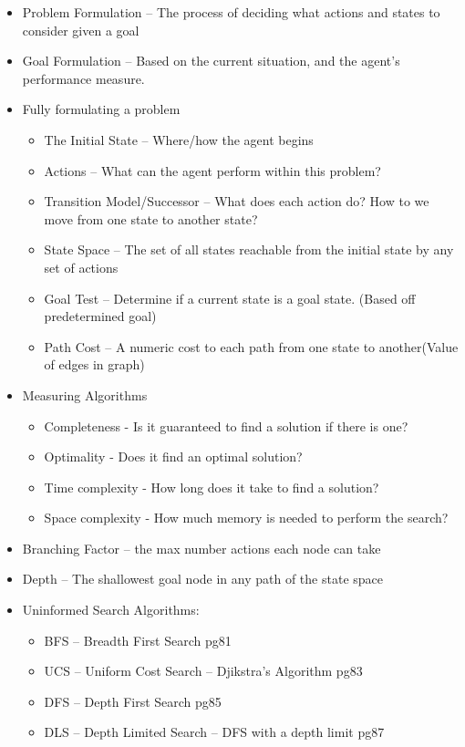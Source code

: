 \documentclass{article}
\begin{document}
\begin{itemize}
	\item Problem Formulation -- The process of deciding what actions and states to consider given a goal
	\item Goal Formulation -- Based on the current situation, and the agent's performance measure.
	\item Fully formulating a problem
	\begin{itemize}
		\item The Initial State -- Where/how the agent begins
		\item Actions -- What can the agent perform within this problem?
		\item Transition Model/Successor -- What does each action do? How to we move from one state to another state?
		\item State Space -- The set of all states reachable from the initial state by any set of actions
		\item Goal Test -- Determine if a current state is a goal state. (Based off predetermined goal)
		\item Path Cost -- A numeric cost to each path from one state to another(Value of edges in graph)
	\end{itemize}
	\item Measuring Algorithms
	\begin{itemize}
		\item Completeness - Is it guaranteed to find a solution if there is one?
		\item Optimality - Does it find an optimal solution?
		\item Time complexity - How long does it take to find a solution?
		\item Space complexity - How much memory is needed to perform the search?
	\end{itemize}
	\item Branching Factor -- the max number actions each node can take
	\item Depth -- The shallowest goal node in any path of the state space
	\item Uninformed Search Algorithms:
	\begin{itemize}
		\item BFS -- Breadth First Search pg81
		\item UCS -- Uniform Cost Search -- Djikstra's Algorithm pg83
		\item DFS -- Depth First Search pg85
		\item DLS -- Depth Limited Search -- DFS with a depth limit pg87

\end{itemize}
\end{itemize}
\end{document}
